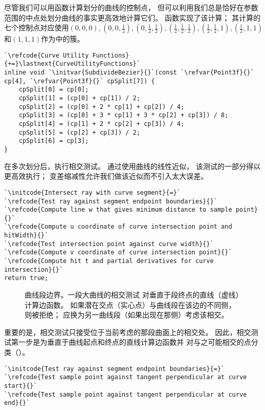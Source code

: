 尽管我们可以用函数计算划分的曲线的控制点，
但可以利用我们总是恰好在参数范围的中点处划分曲线的事实更高效地计算它们。
函数实现了该计算；
其计算的七个控制点对应使用$(0,0,0),(0,0,\frac{1}{2}),
    (0,\frac{1}{2},\frac{1}{2}),(\frac{1}{2},\frac{1}{2},\frac{1}{2}),
    (\frac{1}{2},\frac{1}{2},1),(\frac{1}{2},1,1)$和$(1,1,1)$作为中的簇。
\begin{lstlisting}
`\refcode{Curve Utility Functions}{+=}\lastnext{CurveUtilityFunctions}`
inline void `\initvar{SubdivideBezier}{}`(const `\refvar{Point3f}{}` cp[4], `\refvar{Point3f}{}` cpSplit[7]) {
    cpSplit[0] = cp[0];
    cpSplit[1] = (cp[0] + cp[1]) / 2;
    cpSplit[2] = (cp[0] + 2 * cp[1] + cp[2]) / 4;
    cpSplit[3] = (cp[0] + 3 * cp[1] + 3 * cp[2] + cp[3]) / 8;
    cpSplit[4] = (cp[1] + 2 * cp[2] + cp[3]) / 4;
    cpSplit[5] = (cp[2] + cp[3]) / 2;
    cpSplit[6] = cp[3];
} 
\end{lstlisting}

在多次划分后，执行相交测试。
通过使用曲线的线性近似，
该测试的一部分得以更高效执行；
变差缩减性允许我们做该近似而不引入太大误差。
\begin{lstlisting}
`\initcode{Intersect ray with curve segment}{=}`
`\refcode{Test ray against segment endpoint boundaries}{}`
`\refcode{Compute line w that gives minimum distance to sample point}{}`
`\refcode{Compute u coordinate of curve intersection point and hitWidth}{}`
`\refcode{Test intersection point against curve width}{}`
`\refcode{Compute v coordinate of curve intersection point}{}`
`\refcode{Compute hit t and partial derivatives for curve intersection}{}`
return true;
\end{lstlisting}
\begin{figure}[htbp]
    \centering
    \caption{曲线段边界。一段大曲线的相交测试
        对垂直于段终点的直线（虚线）计算边函数。
        如果潜在交点（实心点）与曲线段在该边的不同侧，则被拒绝；
        应换为另一曲线段（如果出现在那侧）考虑该相交。}
    \label{fig:3.21}
\end{figure}

重要的是，相交测试只接受位于当前考虑的那段曲面上的相交处。
因此，相交测试第一步是为垂直于曲线起点和终点的直线计算边函数并
对与之可能相交的点分类（）。
\begin{lstlisting}
`\initcode{Test ray against segment endpoint boundaries}{=}`
`\refcode{Test sample point against tangent perpendicular at curve start}{}`
`\refcode{Test sample point against tangent perpendicular at curve end}{}`
\end{lstlisting}

